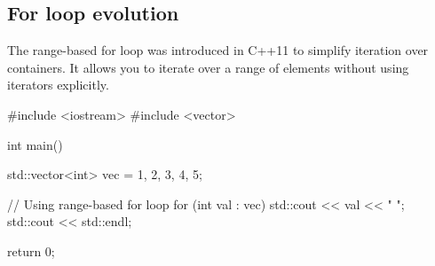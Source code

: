 \subsection*{For loop evolution}

The range-based for loop was introduced in C++11 to simplify iteration over containers. It allows you to iterate over a range of elements without using iterators explicitly.

\begin{exampleblock}
\begin{codeblock}[language=C++]
#include <iostream>
#include <vector>

int main() {
    std::vector<int> vec = {1, 2, 3, 4, 5};

    // Using range-based for loop
    for (int val : vec) {
        std::cout << val << " ";
    }
    std::cout << std::endl;

    return 0;
}
\end{codeblock}
\end{exampleblock}


